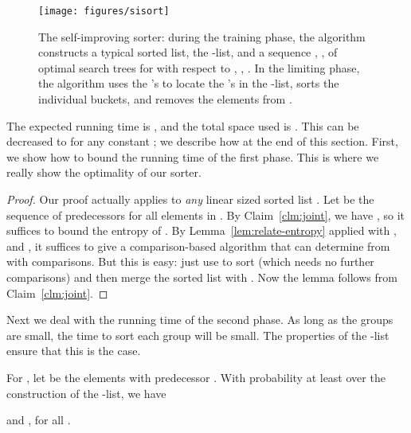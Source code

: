 \documentclass{siamltex}
\begin{document}
\begin{figure}
\begin{center}
\texttt{[image: figures/sisort]}
\end{center}
\caption{The self-improving sorter: during the training phase, the algorithm
constructs a typical sorted list, the -list, 
and a sequence , , 
of optimal search trees for  with respect to , , .
In the limiting phase, the algorithm uses the 's to locate the 
's in the -list, sorts the individual buckets, and removes the
elements from .}
\label{fig:sisort}
\end{figure}

The expected running time is , and 
the total space used is . This can be decreased to 
for any constant ; we describe how at the end of this section.
First, we show how to bound the running time of the first phase.
This is where we really show the optimality of our sorter.
\medskip
\begin{lemma} \label{lem:fredman-revisited}

\end{lemma}

\begin{proof}
Our proof actually applies to  \emph{any}
linear sized sorted list . 
Let  be the
sequence of predecessors for all elements in .
By Claim~\ref{clm:joint}, we have ,
so it suffices to bound the entropy of .
By Lemma~\ref{lem:relate-entropy} applied with
,    and ,
it suffices to give a comparison-based algorithm that can
determine  from  with 
comparisons. But this is easy: just use  to
sort  (which needs no further comparisons) and then
merge the sorted list  with . Now the lemma follows
from Claim~\ref{clm:joint}.
\end{proof}
\medskip

Next we deal with the running time of the second phase. As long
as the groups  are small, the time to sort each group will
be small. The properties of the -list ensure that this is the case.
\medskip
\begin{lemma} \label{lem:quicksort} 
For , let 
be the elements with predecessor .
With probability at least 
over the construction of the -list, we have 

and 
, 
for all .
\end{lemma}
\end{document}
